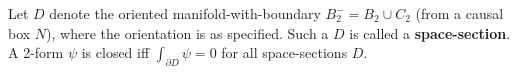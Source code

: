 Let $D$ denote the oriented manifold-with-boundary $B_2^- = B_2 \cup C_2$ (from a causal box $N$), where the orientation is as specified. Such a $D$ is called a \textbf{space-section}. A 2-form $\psi$ is closed iff $\int_{\partial D} \psi = 0$ for all space-sections $D$.
